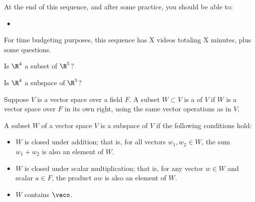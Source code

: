 







At the end of this sequence, and after some practice, you should be able to:

\begin{itemize}
\item 


\end{itemize}


For time budgeting purposes, this sequence has X videos totaling X minutes, 
plus some questions.  




\endedxtext

\endedxvertical








Is $\R^4$ a subset of $\R^5$?  



Is $\R^4$ a subspace of $\R^5$?  




\endedxproblem

\endedxvertical






{}  
Suppose $V$ is a vector space over a field $F$.  A subset $W \subset V$ is a {}  
of $V$ if $W$ is a vector space over $F$ in its own right, using the same vector operations as in $V$.  

{}  
A subset $W$ of a vector space $V$ is a subspace of $V$ if the following conditions hold:
\begin{itemize}
\item
$W$ is closed under addition; that is, for all vectors $w_1,w_2 \in W$, the sum $w_1+w_2$ is also an
element of $W$.  
\item
$W$ is closed under scalar multiplication; that is, for any vector $w\in W$ and scalar $a \in F$, the
product $aw$ is also an element of $W$.  
\item
$W$ contains $\veco$.  
\end{itemize}




